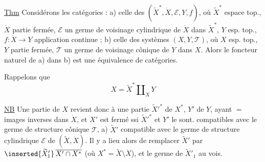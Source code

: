 \uline{Thm} Considérons les  catégories  :
a) celle des 
$(\widetilde X^*,\dot X,\mathcal E,Y,f)$, où
$\widetilde X^*$ espace top., $\dot X$ partie fermée, $\mathcal E$ un germe
de voisinage cylindrique de $\dot X$ dans $\widetilde X^*$,
$Y$ esp. top., $f:\dot X\longrightarrow Y$ application continue ;
b) celle des systèmes $(X,Y,\mathcal T)$, où
$X$ esp. top., $Y$ partie fermée, $\mathcal T$ un germe
de voisinage cônique de $Y$ dans $X$. 
 Alors le foncteur naturel  de a)
dans b) est une équivalence de catégories.


Rappelons que
\[
X=\widetilde X^*\amalg_{\dot X}Y
\]

\uline{NB} Une partie  de $X$ revient donc à une
partie $\widetilde X'^*$ de $X^*$, $Y'$ de $Y$, ayant $=$
images inverses dans $\dot X$, et $X'$ est fermé ssi
$\widetilde X'^*$ et $Y'$ le sont. 
compatibles avec le germe de structure
cônique $\mathcal T$, 
a) $\widetilde X'$ compatible avec le germe de structure
cylindrique $\mathcal E$ de $(\widetilde X,\dot X)$.
Il y a lieu alors de remplacer $\widetilde X'$ par
$\inserted{\widetilde X'_1}\,\overline{X'\cap X^*}$
(où $X^*=\widetilde X\setminus\dot X$), et le germe de $\widetilde X'_1$ au vois.
